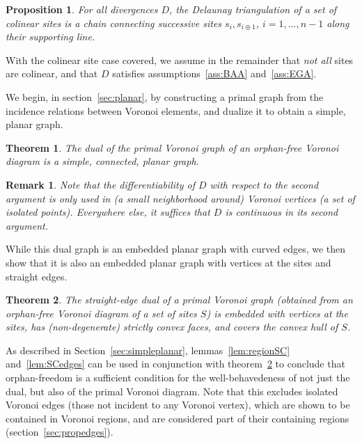 \documentclass[11pt]{article}
\newtheorem{theorem}{Theorem}
\newtheorem{proposition}{Proposition}
\newtheorem{remark}{Remark}
\newcommand{\Sites}{S}
\begin{document}
\begin{proposition}
{For all divergences} $D$, 
	the Delaunay triangulation of a set of colinear sites is a chain connecting successive sites $s_i,s_{i\oplus 1}$, $i=1,\dots,n-1$ 
	along their supporting line. 
\end{proposition}

With the colinear site case covered, we assume in the remainder 
	that \emph{not all} sites are colinear, 
	and that $D$ satisfies assumptions~\ref{ass:BAA} and~\ref{ass:EGA}. 


We begin, in section~\ref{sec:planar}, by constructing a primal graph from the incidence relations between Voronoi elements, 
	and dualize it to obtain a simple, planar graph. 

\begin{theorem}\label{th:simpleplanar}
The dual of the primal Voronoi graph of an orphan-free Voronoi diagram 
	is a simple, connected, planar graph. 
\end{theorem}

\begin{remark}
Note that the differentiability of $D$ with respect to the second argument is only used in (a small neighborhood around) Voronoi vertices 
	(a set of isolated points). 
Everywhere else, it suffices that $D$ is continuous in its second argument. 
\end{remark}


While this dual graph is an embedded planar graph with curved edges, we then show
	that it is also an embedded planar graph with vertices at the sites and straight edges. 



\begin{theorem}\label{th:main}
	The straight-edge dual of a primal Voronoi graph
	(obtained from an orphan-free Voronoi diagram of a set of sites $\Sites$)
is embedded with vertices at the sites, 
		has (non-degenerate) strictly convex faces, and covers the convex hull of $\Sites$. 
\end{theorem}


As described in Section~\ref{sec:simpleplanar}, lemmas~\ref{lem:regionSC} and~\ref{lem:SCedges} 
	can be used in conjunction with theorem~\ref{th:main} to 
	conclude that orphan-freedom 
	is a sufficient condition 
	for the well-behavedeness of not just the 
dual, but also of the primal Voronoi diagram. 
Note that this excludes isolated Voronoi edges (those not incident to any Voronoi vertex), 
	which are shown to be contained in Voronoi regions, 
	and are considered part of their containing regions (section~\ref{sec:propedges}). 
\end{document}

